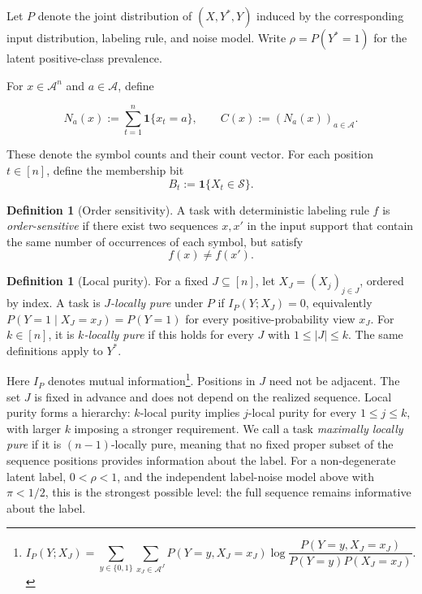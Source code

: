 \documentclass{article} %
\theoremstyle{plain}
\theoremstyle{definition}
\newtheorem{definition}[theorem]{Definition}
\theoremstyle{remark}
\begin{document}
Let $P$ denote the joint distribution of $(X,Y^*,Y)$ induced
by the corresponding input distribution, labeling rule, and
noise model. Write $\rho=P(Y^*=1)$ for the latent positive-class
prevalence.

For $x\in\mathcal{A}^n$ and $a\in\mathcal{A}$, define

\begin{equation}
\label{eq:Na}
N_a(x):=\sum_{t=1}^{n}\mathbf{1}\{x_t=a\},
\qquad
C(x):=(N_a(x))_{a\in\mathcal{A}}.
\end{equation}

These denote the symbol counts and their count vector.
For each position $t\in[n]$, define the membership bit
\begin{equation}
\label{eq:Bt}
B_t:=\mathbf{1}\{X_t\in\mathcal{S}\}.    
\end{equation}

\begin{definition}[Order sensitivity]
\label{def:order_sensitivity}
A task with deterministic labeling rule $f$ is
\emph{order-sensitive} if there exist two sequences $x,x'$
in the input support that contain the same number of
occurrences of each symbol, but satisfy
\[
f(x)\neq f(x').
\]
\end{definition}

\label{sec:pure_sequential_def}

\begin{definition}[Local purity]
\label{def:local_purity}
For a fixed $J\subseteq[n]$, let $X_J=(X_j)_{j\in J}$, ordered by index. A task is \emph{$J$-locally pure} under $P$ if $I_P(Y;X_J)=0$, equivalently $P(Y=1\mid X_J=x_J)=P(Y=1)$ for every positive-probability view $x_J$. For $k\in[n]$, it is \emph{$k$-locally pure} if this holds for every $J$ with $1\leq|J|\leq k$. The same definitions apply to $Y^*$.
\end{definition}

Here $I_P$ denotes mutual information\footnote{\[
I_P(Y;X_J)
=
\sum_{y\in\{0,1\}}
\sum_{x_J\in\mathcal A^J}
P(Y=y,X_J=x_J)
\log
\frac{
P(Y=y,X_J=x_J)
}{
P(Y=y)P(X_J=x_J)
}.
\]}. Positions in $J$ need not be adjacent. The set $J$ is fixed in advance and does not depend on the realized sequence.  Local purity forms a hierarchy: $k$-local purity implies $j$-local purity for every $1\leq j\leq k$, with larger $k$ imposing a stronger requirement. We call a task
\emph{maximally locally pure} if it is $(n-1)$-locally pure,
meaning that no fixed proper subset of the sequence positions
provides information about the label. For a non-degenerate
latent label, $0<\rho<1$, and the independent label-noise
model above with $\pi<1/2$, this is the strongest possible
level: the full sequence remains informative about the label.
\end{document}
